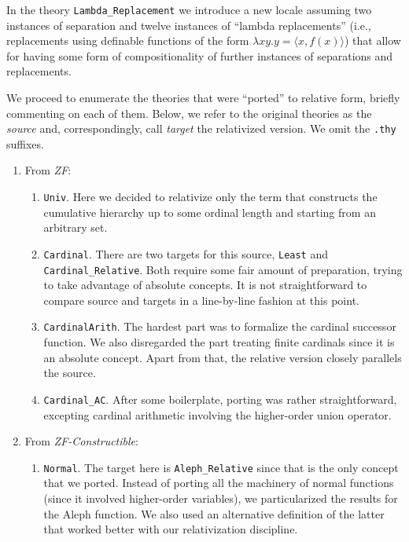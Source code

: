 \documentclass[11pt,a4paper]{article}
\newcommand{\session}[1]{\textit{#1}}
\newcommand{\theory}[1]{\texttt{#1}}
\begin{document}
In the theory \theory{Lambda\_Replacement} we introduce a new locale assuming
two instances of separation and twelve instances of ``lambda replacements''
(i.e., replacements using definable functions of the form $\lambda x y. y=\langle x, f(x) \rangle$)
that allow for having some form of compositionality of further instances
of separations and replacements.

We proceed to enumerate the theories that were ``ported'' to relative
form, briefly commenting on each of them. Below, we refer to the
original theories as the \emph{source} and, correspondingly, call
\emph{target} the relativized version. We omit the \theory{.thy}
suffixes.

\begin{enumerate}
\item From \session{ZF}:
  \begin{enumerate}
  \item \theory{Univ}. Here we decided to relativize only the term
     that constructs the cumulative hierarchy up to some
    ordinal length and starting from an arbitrary set.
  \item \theory{Cardinal}. There are two targets for this source,
    \theory{Least} and \theory{Cardinal\_Relative}. Both require some
    fair amount of preparation, trying to take advantage of absolute
    concepts. It is not straightforward to compare source and targets
    in a line-by-line fashion at this point.
  \item \theory{CardinalArith}. The hardest part was to formalize the
    cardinal successor function. We also disregarded the part treating
    finite cardinals since it is an absolute concept. Apart from that,
    the relative version closely parallels the source.
  \item \theory{Cardinal\_AC}. After some boilerplate, porting was
    rather straightforward, excepting cardinal arithmetic involving
    the higher-order union operator.
  \end{enumerate}
\item From \session{ZF-Constructible}:
  \begin{enumerate}
  \item \theory{Normal}. The target here is \theory{Aleph\_Relative}
    since that is the only concept that we ported. Instead of porting
    all the machinery of normal functions (since it involved
    higher-order variables), we particularized the results for the
    Aleph function. We also used an alternative definition of the
    latter that worked better with our relativization discipline.

\end{enumerate}
\end{enumerate}
\end{document}
